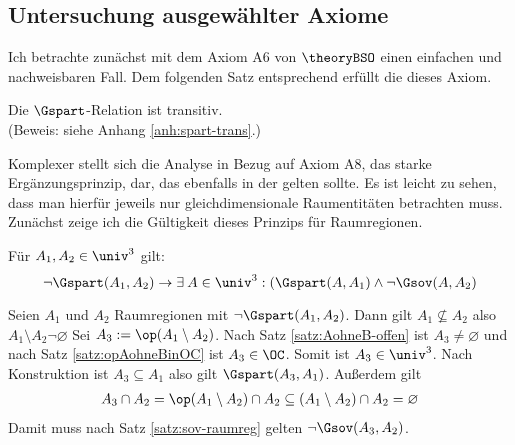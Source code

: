 \subsection{Untersuchung ausgewählter Axiome}

    Ich betrachte zunächst mit dem Axiom A6 von $\theoryBSO$ einen einfachen und nachweisbaren Fall. Dem folgenden Satz entsprechend erfüllt die \strukt dieses Axiom.     %
    \begin{satz}\label{satz:spart-trans}
        Die $\Gspart$-Relation ist transitiv.\\
        (Beweis: siehe Anhang \ref{anh:spart-trans}.)
    \end{satz}
%
%
    Komplexer stellt sich die Analyse in Bezug auf Axiom A8, das starke Ergänzungsprinzip, dar, das ebenfalls in der \strukt gelten sollte. 
    Es ist leicht zu sehen, dass man hierfür jeweils nur gleichdimensionale Raumentitäten betrachten muss.
    Zunächst zeige ich die Gültigkeit dieses Prinzips für Raumregionen.
%
    \begin{satz}
        Für $A_1,A_2 \in \univ^3$ gilt: 
        $$\neg \Gspart(A_1,A_2) \to \exists\: A \in  \univ^3: (\Gspart(A,A_1) \wedge \neg \Gsov(A,A_2)$$
    \end{satz}
%
    \begin{bew}
        Seien $A_1$ und $A_2$ Raumregionen mit $\neg \Gspart(A_1,A_2)$.
        Dann gilt $A_1 \nsubseteq A_2$ also $A_1 \setminus A_2 \neg \varnothing$
        Sei $A_3 := \op(A_1 \setminus A_2)$.
        Nach Satz \ref{satz:AohneB-offen} ist $A_3 \neq \varnothing$ und nach Satz \ref{satz:opAohneBinOC} ist $A_3 \in \OC$.
        Somit ist $A_3 \in \univ^3$.
        Nach Konstruktion ist $A_3 \subseteq A_1$ also gilt $\Gspart(A_3,A_1)$.
        Außerdem gilt
        \begin{align*}
            A_3 \cap A_2 
            = \op(A_1 \setminus A_2) \cap A_2 
            \subseteq (A_1 \setminus A_2) \cap A_2 
            = \varnothing
        \end{align*}
        Damit muss nach Satz \ref{satz:sov-raumreg} gelten $\neg \Gsov(A_3,A_2)$.
    \end{bew}
